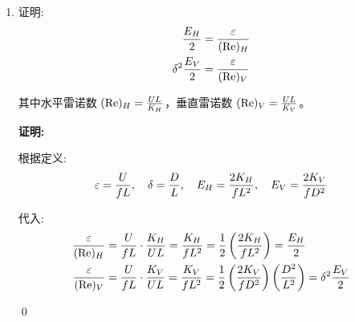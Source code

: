 \begin{enumerate}
    \vspace{1em}
    \textbf{证明:}

    时间尺度 $\timescale \sim \hscale/\hvel$，对动量方程各项进行量级估计:
    \begin{equation*}
        \underbrace{\pde{\vel_h}{\timevar} + (\vel_h \cdot \nabla) \vel_h}_{\hvel^2 / \hscale} + \underbrace{\coriolis \kvec \times \vel_h}_{\coriolis_0 \hvel} = -\underbrace{\nabla_h \gravpotential^\prime}_{\Phi^\prime / \hscale}
    \end{equation*}

    为维持动力学平衡，右端项的量级必须与左端主导项的量级相当:
    \begin{equation*}
        \Phi^\prime \sim \hscale \max\left(\frac{\hvel^2}{\hscale}, \coriolis_0 \hvel\right) = \max\left(\frac{\hvel}{\coriolis_0 \hscale} \coriolis_0 \hvel \hscale,\coriolis_0 \hvel \hscale\right) =
        \coriolis_0 \hvel \hscale \max(1, \ro)
    \end{equation*}

    \qed

    \item 证明:
    \begin{align*}
        \frac{E_H}{2} &= \frac{\varepsilon}{(\text{Re})_H} \\
        \delta^2 \frac{E_V}{2} &= \frac{\varepsilon}{(\text{Re})_V}
    \end{align*}

    其中水平雷诺数 $(\text{Re})_H = \frac{U L}{K_H}$，垂直雷诺数 $(\text{Re})_V = \frac{U L}{K_V}$。

    \vspace{1em}
    \textbf{证明:}

    根据定义:
    \begin{equation*}
        \varepsilon = \frac{U}{f L}, \quad \delta = \frac{D}{L}, \quad E_H = \frac{2K_H}{f L^2}, \quad E_V = \frac{2K_V}{f D^2}
    \end{equation*}

    代入:
    \begin{align*}
        \frac{\varepsilon}{(\text{Re})_H} &= \frac{U}{f L} \cdot \frac{K_H}{U L} = \frac{K_H}{f L^2} = \frac{1}{2} \left(\frac{2K_H}{f L^2}\right) = \frac{E_H}{2} \\
        \frac{\varepsilon}{(\text{Re})_V} &= \frac{U}{f L} \cdot \frac{K_V}{U L} = \frac{K_V}{f L^2} = \frac{1}{2} \left(\frac{2K_V}{f D^2}\right) \left(\frac{D^2}{L^2}\right) = \delta^2 \frac{E_V}{2}
    \end{align*}

    \qed

\end{enumerate}
